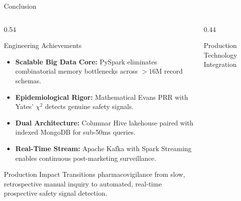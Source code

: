 \documentclass[11pt, aspectratio=169]{beamer}
\begin{document}
\begin{frame}{Conclusion}
\footnotesize
\begin{columns}[T]
  \begin{column}{0.54\textwidth}
    \begin{block}{\footnotesize Engineering Achievements}
      \begin{itemize}\scriptsize
        \item \textbf{Scalable Big Data Core:} PySpark eliminates combinatorial memory bottlenecks across $>16\text{M}$ record schemas.
        \item \textbf{Epidemiological Rigor:} Mathematical Evans PRR with Yates' $\chi^2$ detects genuine safety signals.
        \item \textbf{Dual Architecture:} Columnar Hive lakehouse paired with indexed MongoDB for sub-50ms queries.
        \item \textbf{Real-Time Stream:} Apache Kafka with Spark Streaming enables continuous post-marketing surveillance.
      \end{itemize}
    \end{block}

    \vspace{0.01cm}
    \begin{alertblock}{\footnotesize Production Impact}
      \scriptsize
      Transitions pharmacovigilance from slow, retrospective manual inquiry to automated, real-time prospective safety signal detection.
    \end{alertblock}
  \end{column}

  \begin{column}{0.44\textwidth}
    \begin{exampleblock}{\footnotesize Production Technology Integration}
      \centering
      \vspace{0.01cm}
\end{exampleblock}
\end{column}
\end{columns}
\end{frame}
\end{document}
